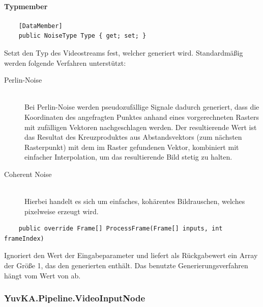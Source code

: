 \paragraph{Typmember}
\begin{itemize}

	\begin{verbatim}
	[DataMember]
	public NoiseType Type { get; set; }
	\end{verbatim}
	Setzt den Typ des Videostreams fest, welcher generiert wird. Standardmäßig werden folgende Verfahren unterstützt:
	\begin{description}
		\item[Perlin-Noise]~\\
		Bei Perlin-Noise werden pseudozufällige Signale dadurch generiert, dass die Koordinaten des angefragten Punktes anhand eines vorgerechneten Rasters mit zufälligen Vektoren nachgeschlagen werden. Der resultierende Wert ist das Resultat des Kreuzproduktes aus Abstandsvektors (zum nächsten Rasterpunkt) mit dem im Raster gefundenen Vektor, kombiniert mit einfacher Interpolation, um das resultierende Bild stetig zu halten.
		\item[Coherent Noise]~\\
		Hierbei handelt es sich um einfaches, kohärentes Bildrauschen, welches pixelweise erzeugt wird.
	\end{description}

	\begin{verbatim}
	public override Frame[] ProcessFrame(Frame[] inputs, int frameIndex)
	\end{verbatim}
	Ignoriert den Wert der Eingabeparameter und liefert als Rückgabewert ein Array der Größe 1, das den generierten  enthält. Das benutzte Generierungsverfahren hängt vom Wert von  ab.


\end{itemize}

\subsubsection{YuvKA.Pipeline.VideoInputNode}

